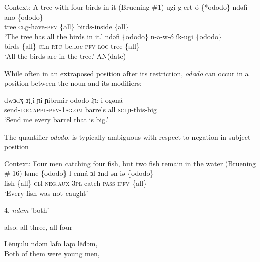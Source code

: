 \ea Context: A tree with four birds in it (Bruening \#1) \label{allpost}
	\ea \gll ugi g-ert-ó \{*ododo\} ndəfí-ano \{ododo\}\\
			tree \textsc{cl}g-have-\textsc{pfv} \{all\} birds-inside \{all\}\\
		\glt	‘The tree has all the birds in it.’
	\ex \gll ndəfi \{ododo\} n-a-w-ó ík-ugi \{ododo\}\\
			 birds \{all\} \textsc{cl}n-\textsc{rtc}-be.loc-\textsc{pfv} \textsc{loc}-tree \{all\}\\
		\glt	‘All the birds are in the tree.’  \hfill AN(date)
	\z
\z 

While often in an extraposed position after its restriction, \textit{ododo} can occur in a position between the noun and its modifiers: %

\ea \gll dwɜdʒ-ɜt̪-i-ɲi ɲibrmir ododo íɲ:-i-ogəná			\\
send-\textsc{loc}.\textsc{appl}-\textsc{pfv}-1\textsc{sg}.\textsc{om} barrels all \textsc{scl}ɲ-this-big\\ 
	\glt 	‘Send me every barrel that is big.’ \z  




The quantifier \textit{ododo}, is typically ambiguous with respect to negation in subject position %

\ea Context: Four men catching four fish, but two fish remain in the water (Bruening \# 16)
	\gll ləme \{ododo\} l-enná ɜl-ɜnd-ən-iə \{ododo\}		\\
		 fish \{all\}	\textsc{cl}l-\textsc{neg.aux} 3\textsc{pl}-catch-\textsc{pass}-\textsc{\textsc{ipfv}} \{all\}\\
	\glt ‘Every fish was not caught’
\z 

4. \textit{ndem} 'both' %

also: all three, all four

Lënŋulu ndǝm lafo laɽo lëđǝm,\\
Both of them were young men,\\

